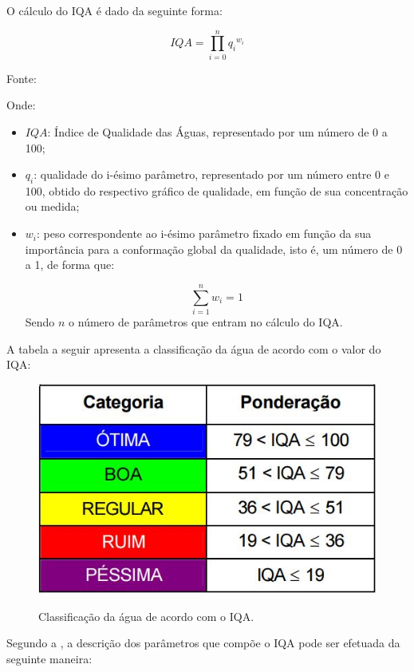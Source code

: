 O cálculo do IQA é dado da seguinte forma:

$$ IQA = \prod_{i = 0}^{n} {q_i}^{w_i} $$

\begin{center}
Fonte: \cite{anaGovIndicadores}
\end{center}

Onde:

\begin{itemize}
 \item $IQA$: Índice de Qualidade das Águas, representado por um número de 0 a 100;
 \item $q_i$: qualidade do i-ésimo parâmetro, representado por um número entre 0 e 100, obtido do respectivo gráfico de qualidade, em função de sua concentração ou medida;
 \item $w_i$: peso correspondente ao i-ésimo parâmetro fixado em função da sua importância para a conformação global da qualidade, isto é,  um número de 0 a 1, de forma que:
 
    $$ \sum_{i=1}^n w_i = 1 $$
    Sendo $n$ o número de parâmetros que entram no cálculo do IQA.
\end{itemize}

A tabela a seguir apresenta a classificação da água de acordo com o valor do IQA:

\begin{figure}[!h]
\centering
\includegraphics[scale=0.7]{editaveis/figuras/tabela_classificacao_IQA}
\label{tabela_classificacao_IQA}
\caption[Classificação da água de acordo com o IQA]{Classificação da água de acordo com o IQA.\footnotemark}
\end{figure}
\FloatBarrier
{}

Segundo a \cite{anaGovIndicadores}, a descrição dos parâmetros que compõe o IQA pode ser efetuada da seguinte maneira:

